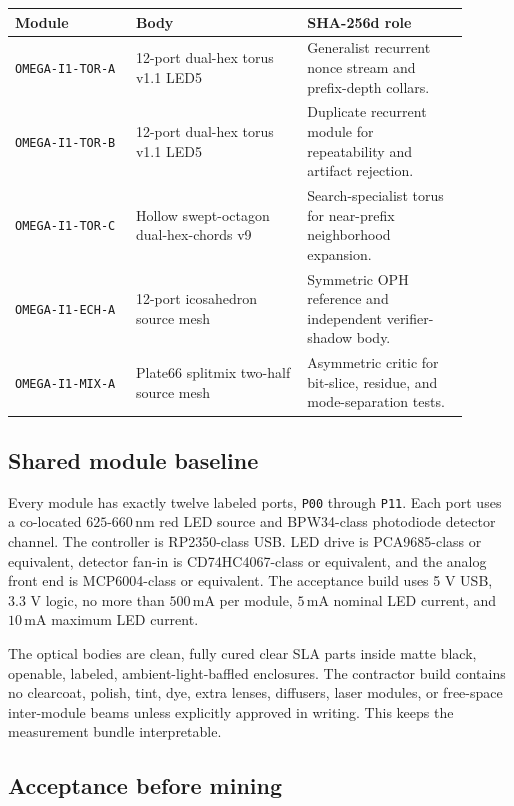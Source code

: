 \documentclass[11pt]{article}
\theoremstyle{definition}
\theoremstyle{remark}
\begin{document}
\begin{center}
\small
\begin{tabular}{L{0.24\linewidth}L{0.34\linewidth}L{0.32\linewidth}}
\toprule
Module & Body & SHA-256d role\\
\midrule
\texttt{OMEGA-I1-TOR-A} & 12-port dual-hex torus v1.1 LED5 &
Generalist recurrent nonce stream and prefix-depth collars.\\
\texttt{OMEGA-I1-TOR-B} & 12-port dual-hex torus v1.1 LED5 &
Duplicate recurrent module for repeatability and artifact rejection.\\
\texttt{OMEGA-I1-TOR-C} & Hollow swept-octagon dual-hex-chords v9 &
Search-specialist torus for near-prefix neighborhood expansion.\\
\texttt{OMEGA-I1-ECH-A} & 12-port icosahedron source mesh &
Symmetric OPH reference and independent verifier-shadow body.\\
\texttt{OMEGA-I1-MIX-A} & Plate66 splitmix two-half source mesh &
Asymmetric critic for bit-slice, residue, and mode-separation tests.\\
\bottomrule
\end{tabular}
\end{center}

\subsection{Shared module baseline}

Every module has exactly twelve labeled ports, \texttt{P00} through
\texttt{P11}. Each port uses a co-located \(625\)-\(660\,\mathrm{nm}\) red LED
source and BPW34-class photodiode detector channel. The controller is
RP2350-class USB. LED drive is PCA9685-class or equivalent, detector fan-in is
CD74HC4067-class or equivalent, and the analog front end is MCP6004-class or
equivalent. The acceptance build uses 5 V USB,
3.3 V logic, no more than \(500\,\mathrm{mA}\) per module, \(5\,\mathrm{mA}\)
nominal LED current, and \(10\,\mathrm{mA}\) maximum LED current.

The optical bodies are clean, fully cured clear SLA parts inside matte black,
openable, labeled, ambient-light-baffled enclosures. The contractor build
contains no clearcoat, polish, tint, dye, extra lenses, diffusers, laser modules,
or free-space inter-module beams unless explicitly approved in writing. This
keeps the measurement bundle interpretable.

\subsection{Acceptance before mining}
\end{document}
